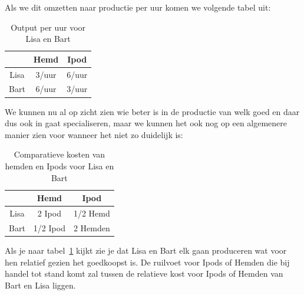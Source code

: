 Als we dit omzetten naar productie per uur komen we volgende tabel uit:

\begin{table}[h]
	\centering
    \begin{tabular}{ | c |  c |  c | }
		\hline
		& Hemd  &  Ipod \\
		\hline
		 Lisa & 3/uur & 6/uur \\
		\hline
		Bart & 6/uur & 3/uur\\
		\hline
	\end{tabular}
	\caption{Output per uur voor Lisa en Bart}
\end{table}

We kunnen nu al op zicht zien wie beter is in de productie van welk goed en daar dus ook in gaat specialiseren, maar we kunnen het ook nog op een algemenere manier zien voor wanneer het niet zo duidelijk is:

\begin{table}[h]
	\centering
    \begin{tabular}{ | c |  c |  c | }
		\hline
		& Hemd  &  Ipod \\
		\hline
		 Lisa & 2 Ipod & 1/2 Hemd \\
		\hline
		Bart & 1/2 Ipod & 2 Hemden\\
		\hline
	\end{tabular}
	\caption{Comparatieve kosten van hemden en Ipods voor Lisa en Bart}
    \label{table:sec1:compCost}
\end{table}

Als je naar tabel~\ref{table:sec1:compCost} kijkt zie je dat Lisa en Bart elk gaan produceren wat voor hen relatief gezien het goedkoopst is. De ruilvoet voor Ipods of Hemden die bij handel tot stand komt zal tussen de relatieve kost voor Ipods of Hemden van Bart en Lisa liggen.

